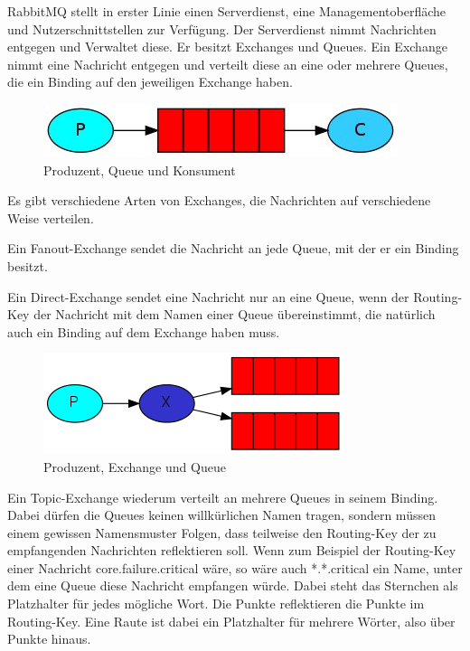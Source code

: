 \documentclass[12pt,a4paper]{scrartcl}
\begin{document}
RabbitMQ stellt in erster Linie einen Serverdienst, eine Managementoberfläche und Nutzerschnittstellen zur Verfügung. Der Serverdienst nimmt Nachrichten entgegen und Verwaltet diese. 
Er besitzt Exchanges und Queues. Ein Exchange nimmt eine Nachricht entgegen und verteilt diese an eine oder mehrere Queues, die ein Binding auf den jeweiligen Exchange haben. 

\begin{figure}[h!]
	\centering
	\includegraphics[scale=1]{P2C.jpg}
	\caption[https://www.rabbitmq.com/tutorials/tutorial-one-dotnet.html]{Produzent, Queue und Konsument}
\end{figure}

Es gibt verschiedene Arten von Exchanges, die Nachrichten auf verschiedene Weise verteilen. 

Ein Fanout-Exchange sendet die Nachricht an jede Queue, mit der er ein Binding besitzt. 

Ein Direct-Exchange sendet eine Nachricht nur an eine Queue, wenn der Routing-Key der Nachricht mit dem Namen einer Queue übereinstimmt, die natürlich auch ein Binding auf dem Exchange haben muss.

\begin{figure}[h!]
	\centering
	\includegraphics[scale=1.65]{exchanges.png}
	\caption[https://www.rabbitmq.com/tutorials/tutorial-three-dotnet.html]{Produzent, Exchange und Queue}
\end{figure}

Ein Topic-Exchange wiederum verteilt an mehrere Queues in seinem Binding. Dabei dürfen die Queues keinen willkürlichen Namen tragen, sondern müssen einem gewissen Namensmuster Folgen, dass teilweise den Routing-Key der zu empfangenden Nachrichten reflektieren soll. Wenn zum Beispiel der Routing-Key einer Nachricht core.failure.critical wäre, so wäre auch *.*.critical ein Name, unter dem eine Queue diese Nachricht empfangen würde. Dabei steht das Sternchen als Platzhalter für jedes mögliche Wort. Die Punkte reflektieren die Punkte im Routing-Key. Eine Raute ist dabei ein Platzhalter für mehrere Wörter, also über Punkte hinaus. 
\end{document}
